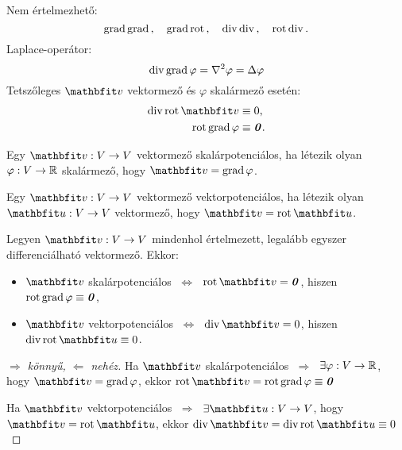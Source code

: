 \begin{note}
  Nem értelmezhető:
  \vspace{-.5em}
  $$
    \operatorname{grad} \operatorname{grad} \text, \quad
    \operatorname{grad} \operatorname{rot} \text, \quad
    \operatorname{div} \operatorname{div} \text, \quad
    \operatorname{rot} \operatorname{div} \text.
  $$
  Laplace-operátor:
  $$
    \operatorname{div} \operatorname{grad} \varphi = \nabla^2 \varphi = \Delta \varphi
  $$
  Tetszőleges $\rvec v$ vektormező és $\varphi$ skalármező esetén:
  \vspace{-.5em}
  \begin{align*}
    \Div \rot \rvec v  & \equiv 0 \text,     \\
    \rot \grad \varphi & \equiv \nvec \text.
  \end{align*}
  \vspace{-2em}
\end{note}

\begin{definition}[Skalárpotenciálosság]
  Egy $\rvec v: V \rightarrow V$ vektormező skalárpotenciálos, ha létezik olyan
  $\varphi: V \rightarrow \mathbb{R}$ skalármező, hogy $\rvec v = \grad \varphi$.
\end{definition}

\begin{definition}[Vektorpotenciálosság]
  Egy $\rvec v: V \rightarrow V$ vektormező vektorpotenciálos, ha létezik olyan
  $\rvec u: V \rightarrow V$ vektormező, hogy $\rvec v = \rot \rvec u$.
\end{definition}

\begin{theorem}
  Legyen $\rvec v: V \rightarrow V$ mindenhol értelmezett, legalább egyszer
  differenciálható vektormező. Ekkor:
  \begin{itemize}
    \item $\rvec v$ skalárpotenciálos
          $\;\Leftrightarrow\;$
          $\rot \rvec v = \nvec$,
          hiszen $\operatorname{rot} \operatorname{grad} \varphi \equiv \text{\textbf{\textit{0}}}$,
    \item $\rvec v$ vektorpotenciálos
          $\;\Leftrightarrow\;$
          $\Div \rvec v = 0$,
          hiszen $\Div \rot \rvec u \equiv 0$.
  \end{itemize}

  \begin{proof}[$\Rightarrow$ könnyű, $\Leftarrow$ nehéz]
    Ha $\rvec v$ skalárpotenciálos $\;\Rightarrow\;$
    $\exists \varphi : V \rightarrow \mathbb{R}$,
    hogy $\rvec v = \grad \varphi$, ekkor
    $\rot \rvec v = \rot \grad \varphi \equiv \nvec$

    Ha $\rvec v$ vektorpotenciálos $\;\Rightarrow\;$
    $\exists \rvec u : V \rightarrow V$,
    hogy $\rvec v = \rot \rvec u$, ekkor
    $\Div \rvec v = \Div \rot \rvec u \equiv 0$
  \end{proof}
\end{theorem}

